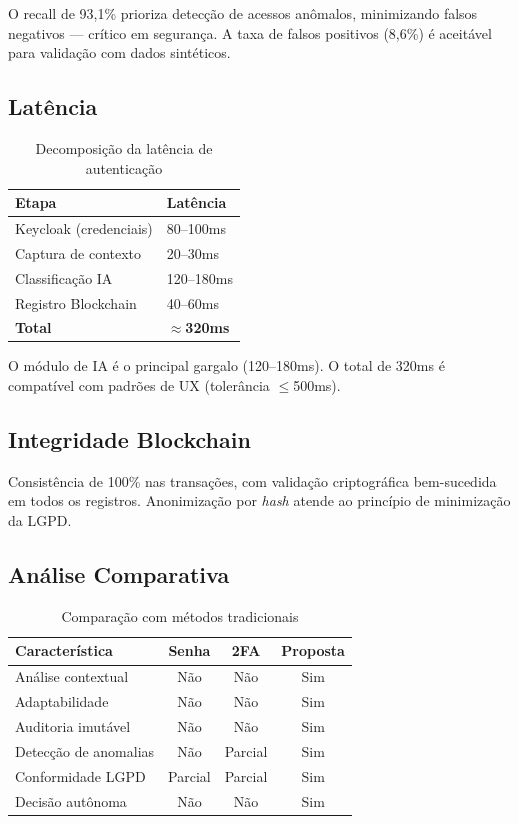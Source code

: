 \documentclass[sigconf,nonacm]{acmart}
\begin{document}
O recall de 93,1\% prioriza detecção de acessos anômalos, minimizando falsos negativos --- crítico em segurança. A taxa de falsos positivos (8,6\%) é aceitável para validação com dados sintéticos.

\subsection{Latência}

\begin{table}[H]
\caption{Decomposição da latência de autenticação}
\label{tab:latency}
\small
\begin{tabular}{@{}ll@{}}
\toprule
Etapa & Latência \\
\midrule
Keycloak (credenciais)  & 80--100ms \\
Captura de contexto     & 20--30ms \\
Classificação IA        & 120--180ms \\
Registro Blockchain     & 40--60ms \\
\midrule
\textbf{Total}          & \textbf{$\approx$320ms} \\
\bottomrule
\end{tabular}
\end{table}

O módulo de IA é o principal gargalo (120--180ms). O total de 320ms é compatível com padrões de UX (tolerância $\leq$500ms).

\subsection{Integridade Blockchain}

Consistência de 100\% nas transações, com validação criptográfica bem-sucedida em todos os registros. Anonimização por \textit{hash} atende ao princípio de minimização da LGPD.

\subsection{Análise Comparativa}

\begin{table}[H]
\caption{Comparação com métodos tradicionais}
\label{tab:comp}
\small
\begin{tabular}{@{}lccc@{}}
\toprule
Característica & Senha & 2FA & Proposta \\
\midrule
Análise contextual     & Não & Não & Sim \\
Adaptabilidade         & Não & Não & Sim \\
Auditoria imutável     & Não & Não & Sim \\
Detecção de anomalias  & Não & Parcial & Sim \\
Conformidade LGPD      & Parcial & Parcial & Sim \\
Decisão autônoma       & Não & Não & Sim \\
\bottomrule
\end{tabular}
\end{table}
\end{document}
